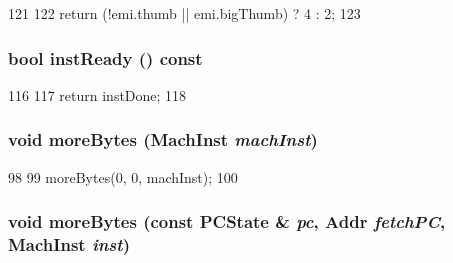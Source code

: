\begin{DoxyCode}
121     {
122         return (!emi.thumb || emi.bigThumb) ? 4 : 2;
123     }
\end{DoxyCode}
\hypertarget{classArmISA_1_1Decoder_aff34b6a32f7726d46b66dd672105c900}{
\subsubsection[{instReady}]{\setlength{\rightskip}{0pt plus 5cm}bool instReady () const}}
\label{classArmISA_1_1Decoder_aff34b6a32f7726d46b66dd672105c900}



\begin{DoxyCode}
116     {
117         return instDone;
118     }
\end{DoxyCode}
\hypertarget{classArmISA_1_1Decoder_ad64ff6faaad6c993e98f9c2bcbf25f0e}{
\subsubsection[{moreBytes}]{\setlength{\rightskip}{0pt plus 5cm}void moreBytes ({\bf MachInst} {\em machInst})}}
\label{classArmISA_1_1Decoder_ad64ff6faaad6c993e98f9c2bcbf25f0e}



\begin{DoxyCode}
98     {
99         moreBytes(0, 0, machInst);
100     }
\end{DoxyCode}
\hypertarget{classArmISA_1_1Decoder_a85a99c8dd9425508bee9a17836dbbd12}{
\subsubsection[{moreBytes}]{\setlength{\rightskip}{0pt plus 5cm}void moreBytes (const PCState \& {\em pc}, \/  {\bf Addr} {\em fetchPC}, \/  {\bf MachInst} {\em inst})}}
\label{classArmISA_1_1Decoder_a85a99c8dd9425508bee9a17836dbbd12}



